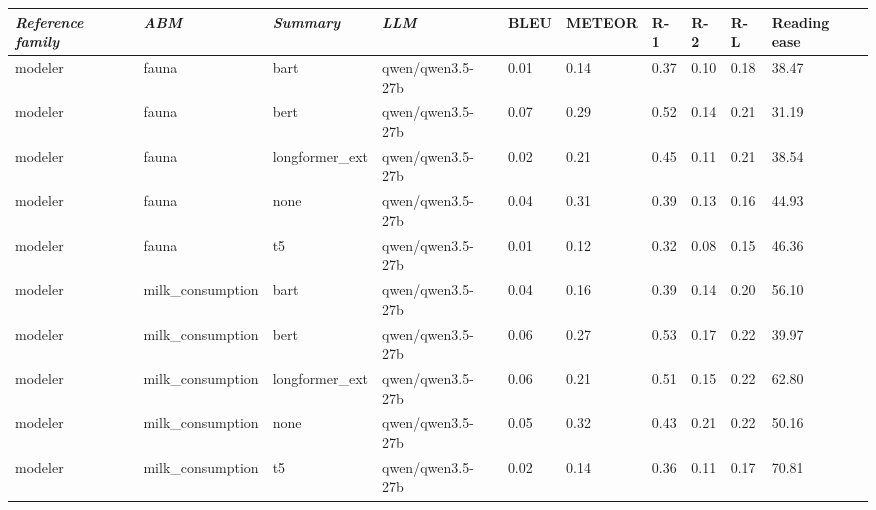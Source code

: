 \begin{tabular}{|l|l|l|l|l|l|l|l|l|l|}
\hline
\textit{\textbf{Reference family}} & \textit{\textbf{ABM}} & \textit{\textbf{Summary}} & \textit{\textbf{LLM}} & BLEU & METEOR & R-1 & R-2 & R-L & Reading ease \\
 \hline
 modeler & fauna & bart & qwen/qwen3.5-27b & 0.01 & 0.14 & 0.37 & 0.10 & 0.18 & 38.47 \\
 \hline
 modeler & fauna & bert & qwen/qwen3.5-27b & 0.07 & 0.29 & 0.52 & 0.14 & 0.21 & 31.19 \\
 \hline
 modeler & fauna & longformer\_ext & qwen/qwen3.5-27b & 0.02 & 0.21 & 0.45 & 0.11 & 0.21 & 38.54 \\
 \hline
 modeler & fauna & none & qwen/qwen3.5-27b & 0.04 & 0.31 & 0.39 & 0.13 & 0.16 & 44.93 \\
 \hline
 modeler & fauna & t5 & qwen/qwen3.5-27b & 0.01 & 0.12 & 0.32 & 0.08 & 0.15 & 46.36 \\
 \hline
 modeler & milk\_consumption & bart & qwen/qwen3.5-27b & 0.04 & 0.16 & 0.39 & 0.14 & 0.20 & 56.10 \\
 \hline
 modeler & milk\_consumption & bert & qwen/qwen3.5-27b & 0.06 & 0.27 & 0.53 & 0.17 & 0.22 & 39.97 \\
 \hline
 modeler & milk\_consumption & longformer\_ext & qwen/qwen3.5-27b & 0.06 & 0.21 & 0.51 & 0.15 & 0.22 & 62.80 \\
 \hline
 modeler & milk\_consumption & none & qwen/qwen3.5-27b & 0.05 & 0.32 & 0.43 & 0.21 & 0.22 & 50.16 \\
 \hline
 modeler & milk\_consumption & t5 & qwen/qwen3.5-27b & 0.02 & 0.14 & 0.36 & 0.11 & 0.17 & 70.81 \\
\hline
\end{tabular}
